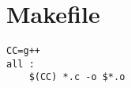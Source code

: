 \section{Makefile}
\begin{lstlisting}[label=Sample Makefile,caption=Sample Makefile]
CC=g++
all :
    $(CC) *.c -o $*.o
\end{lstlisting}
